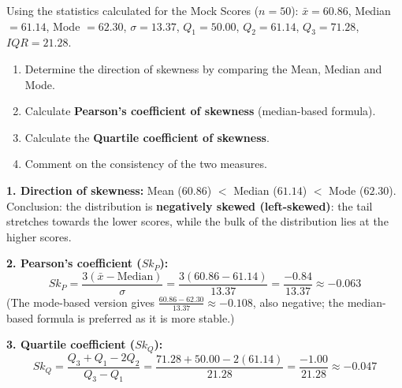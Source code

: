 \documentclass[11pt]{article}
\newcommand{\cle}[1]{{\popxbold\color{popdark}#1}}
\begin{document}
\begin{exoresolu}
Using the statistics calculated for the Mock Scores ($n=50$):
$\bar{x} = 60.86$, Median $= 61.14$, Mode $= 62.30$, $\sigma = 13.37$, $Q_1 = 50.00$, $Q_2 = 61.14$, $Q_3 = 71.28$, $IQR = 21.28$.
\begin{enumerate}
    \item Determine the direction of skewness by comparing the Mean, Median and Mode.
    \item Calculate \textbf{Pearson's coefficient of skewness} (median-based formula).
    \item Calculate the \textbf{Quartile coefficient of skewness}.
    \item Comment on the consistency of the two measures.
\end{enumerate}
\tcblower
\textbf{1. Direction of skewness:}
Mean ($60.86$) $<$ Median ($61.14$) $<$ Mode ($62.30$).
\cle{Conclusion:} the distribution is \textbf{negatively skewed (left-skewed)}: the tail stretches towards the lower scores, while the bulk of the distribution lies at the higher scores.

\textbf{2. Pearson's coefficient ($Sk_P$):}
\[ Sk_P = \frac{3(\bar{x} - \text{Median})}{\sigma} = \frac{3(60.86 - 61.14)}{13.37} = \frac{-0.84}{13.37} \approx \mathbf{-0.063} \]
(The mode-based version gives $\frac{60.86 - 62.30}{13.37} \approx -0.108$, also negative; the median-based formula is preferred as it is more stable.)

\textbf{3. Quartile coefficient ($Sk_Q$):}
\[ Sk_Q = \frac{Q_3 + Q_1 - 2Q_2}{Q_3 - Q_1} = \frac{71.28 + 50.00 - 2(61.14)}{21.28} = \frac{-1.00}{21.28} \approx \mathbf{-0.047} \]


\end{exoresolu}
\end{document}
